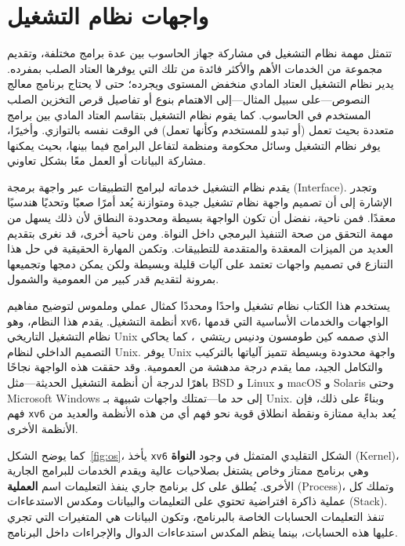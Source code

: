 \chapter{واجهات نظام التشغيل}
\label{CH:UNIX}

تتمثل مهمة نظام التشغيل في مشاركة جهاز الحاسوب بين عدة برامج مختلفة،
وتقديم مجموعة من الخدمات الأهم والأكثر فائدة من تلك التي يوفرها العتاد الصلب بمفرده.
يدير نظام التشغيل العتاد المادي منخفض المستوى ويجرده؛
حتى لا يحتاج برنامج معالج النصوص---على سبيل المثال---إلى الاهتمام بنوع أو تفاصيل
قرص التخزين الصلب المستخدم في الحاسوب.
كما يقوم نظام التشغيل بتقاسم العتاد المادي بين برامج متعددة
بحيث تعمل (أو تبدو للمستخدم وكأنها تعمل) في الوقت نفسه بالتوازي.
وأخيرًا، يوفر نظام التشغيل وسائل محكومة ومنظمة لتفاعل البرامج فيما بينها،
بحيث يمكنها مشاركة البيانات أو العمل معًا بشكل تعاوني.

يقدم نظام التشغيل خدماته لبرامج التطبيقات عبر واجهة برمجة (Interface).
وتجدر الإشارة إلى أن تصميم واجهة نظام تشغيل جيدة ومتوازنة يُعد أمرًا صعبًا وتحديًا هندسيًا معقدًا.
فمن ناحية، نفضل أن تكون الواجهة بسيطة ومحدودة النطاق
لأن ذلك يسهل من مهمة التحقق من صحة التنفيذ البرمجي داخل النواة.
ومن ناحية أخرى، قد نغرى بتقديم العديد من الميزات المعقدة والمتقدمة للتطبيقات.
وتكمن المهارة الحقيقية في حل هذا التنازع في تصميم واجهات تعتمد على آليات قليلة وبسيطة
ولكن يمكن دمجها وتجميعها بمرونة لتقديم قدر كبير من العمومية والشمول.

يستخدم هذا الكتاب نظام تشغيل واحدًا ومحددًا كمثال عملي وملموس لتوضيح مفاهيم أنظمة التشغيل.
يقدم هذا النظام، وهو \texttt{xv6}، الواجهات والخدمات الأساسية التي قدمها
نظام التشغيل التاريخي Unix الذي صممه كين طومسون ودنيس ريتشي~\cite{unix}،
كما يحاكي التصميم الداخلي لنظام Unix.
يوفر Unix واجهة محدودة وبسيطة تتميز آلياتها بالتركيب والتكامل الجيد،
مما يقدم درجة مدهشة من العمومية.
وقد حققت هذه الواجهة نجاحًا باهرًا لدرجة أن أنظمة التشغيل الحديثة---مثل
BSD و Linux و macOS و Solaris وحتى Microsoft Windows إلى حد ما---تمتلك واجهات شبيهة بـ Unix.
وبناءً على ذلك، فإن فهم \texttt{xv6} يُعد بداية ممتازة ونقطة انطلاق قوية
نحو فهم أي من هذه الأنظمة والعديد من الأنظمة الأخرى.

كما يوضح الشكل~\ref{fig:os}، يأخذ \texttt{xv6} الشكل التقليدي المتمثل في وجود \textbf{النواة} (Kernel)،
وهي برنامج ممتاز وخاص يشتغل بصلاحيات عالية ويقدم الخدمات للبرامج الجارية الأخرى.
يُطلق على كل برنامج جاري ينفذ التعليمات اسم \textbf{العملية} (Process)،
وتملك كل عملية ذاكرة افتراضية تحتوي على التعليمات والبيانات ومكدس الاستدعاءات (Stack).
تنفذ التعليمات الحسابات الخاصة بالبرنامج، وتكون البيانات هي المتغيرات التي تجري عليها هذه الحسابات،
بينما ينظم المكدس استدعاءات الدوال والإجراءات داخل البرنامج.

